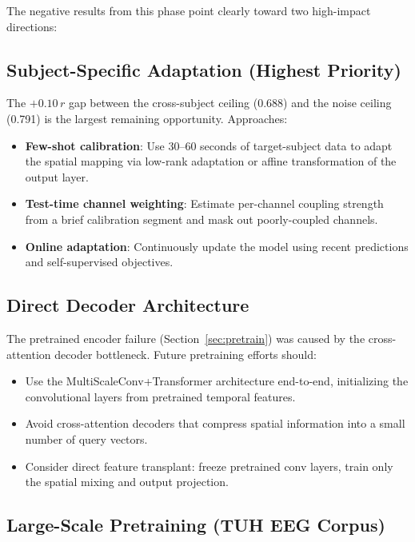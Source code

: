 \documentclass[11pt,a4paper]{article}
\begin{document}
The negative results from this phase point clearly toward two high-impact
directions:

\subsection{Subject-Specific Adaptation (Highest Priority)}

The $+0.10\,r$ gap between the cross-subject ceiling (0.688) and the
noise ceiling (0.791) is the largest remaining opportunity. Approaches:

\begin{itemize}
  \item \textbf{Few-shot calibration}: Use 30--60 seconds of
    target-subject data to adapt the spatial mapping via low-rank
    adaptation or affine transformation of the output layer.
  \item \textbf{Test-time channel weighting}: Estimate per-channel
    coupling strength from a brief calibration segment and mask out
    poorly-coupled channels.
  \item \textbf{Online adaptation}: Continuously update the model using
    recent predictions and self-supervised objectives.
\end{itemize}

\subsection{Direct Decoder Architecture}

The pretrained encoder failure (Section~\ref{sec:pretrain}) was caused by
the cross-attention decoder bottleneck. Future pretraining efforts should:

\begin{itemize}
  \item Use the MultiScaleConv+Transformer architecture end-to-end,
    initializing the convolutional layers from pretrained temporal features.
  \item Avoid cross-attention decoders that compress spatial information
    into a small number of query vectors.
  \item Consider direct feature transplant: freeze pretrained conv layers,
    train only the spatial mixing and output projection.
\end{itemize}

\subsection{Large-Scale Pretraining (TUH EEG Corpus)}
\end{document}
